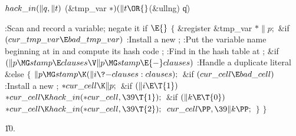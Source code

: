 \Y\B\4\D$\\{hack\_in}(\|q,\|t)$ \5
(\&{tmp\_var} ${}{*})(\|t\OR{}$(\&{ullng}) \|q)\par
\Y\B\4:Scan and record a variable; negate it if \X${}\E{}$%
\6
${}\{{}$\1\6
\&{register} \&{tmp\_var} ${}{*}\|p;{}$\7
\&{if} ${}(\\{cur\_tmp\_var}\E\\{bad\_tmp\_var}){}$\1\5
:Install a new \X;\2\6
:Put the variable name beginning at  in  and compute its hash code \X;\6
:Find  in the hash table at \X;\6
\&{if} ${}(\|p\MG\\{stamp}\E\\{clauses}\V\|p\MG\\{stamp}\E{-}\\{clauses}){}$\1\5
:Handle a duplicate literal\X\2\6
\&{else}\5
${}\{{}$\1\6
${}\|p\MG\\{stamp}\K(\|i\?{-}\\{clauses}:\\{clauses});{}$\6
\&{if} ${}(\\{cur\_cell}\E\\{bad\_cell}){}$\1\5
:Install a new \X;\2\6
${}{*}\\{cur\_cell}\K\|p;{}$\6
\&{if} ${}(\|i\E\T{1}){}$\1\5
${}{*}\\{cur\_cell}\K\\{hack\_in}({*}\\{cur\_cell},\39\T{1});{}$\2\6
\&{if} ${}(\|k\E\T{0}){}$\1\5
${}{*}\\{cur\_cell}\K\\{hack\_in}({*}\\{cur\_cell},\39\T{2});{}$\2\6
${}\\{cur\_cell}\PP,\39\|k\PP;{}$\6
\4${}\}{}$\2\6
\4${}\}{}$\2\par
\U10.\fi

